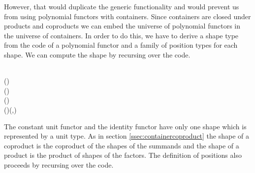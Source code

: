 However, that would duplicate the generic functionality and would
prevent us from using polynomial functors with containers. Since
containers are closed under products and coproducts we can embed the
universe of polynomial functors in the universe of containers. In
order to do this, we have to derive a shape type from the code of a
polynomial functor and a family of position types for each shape. We
can compute the shape by recursing over the code.
\begin{hscode}\SaveRestoreHook
{}%
%
%
%
\>[3]{}\mathbin{::}\to \mathbin{*}{}\<[E]%
\\
\>[3]{}\;\<[18]%
\>[18]{}\mathrel{=}(){}\<[E]%
\\
\>[3]{}\;\<[18]%
\>[18]{}\mathrel{=}(){}\<[E]%
\\
\>[3]{}\;(\;\;){}\<[18]%
\>[18]{}\mathrel{=}\;\mathbin{+}\;\<[E]%
\\
\>[3]{}\;(\;\;){}\<[18]%
\>[18]{}\mathrel{=}(\;,\;){}\<[E]%
\ColumnHook
\end{hscode}\resethooks
The constant unit functor and the identity functor have only one shape
which is represented by a unit type. As in section
\ref{ssec:containercoproduct} the shape of a coproduct is the
coproduct of the shapes of the summands and the shape of a product is
the product of shapes of the factors. The definition of positions also
proceeds by recursing over the code.
